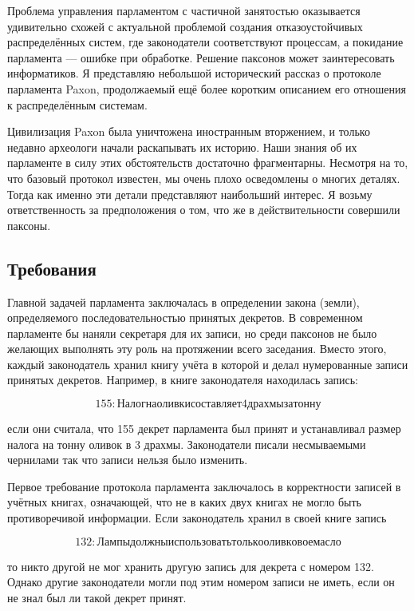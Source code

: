 Проблема управления парламентом с частичной занятостью оказывается удивительно схожей с актуальной проблемой создания отказоустойчивых распределённых систем, где законодатели соответствуют процессам, а покидание парламента --- ошибке при обработке. Решение паксонов может заинтересовать информатиков. Я представляю небольшой исторический рассказ о протоколе парламента Paxon, продолжаемый ещё более коротким описанием его отношения к распределённым системам.

Цивилизация Paxon была уничтожена иностранным вторжением, и только недавно археологи начали раскапывать их историю. Наши знания об их парламенте в силу этих обстоятельств достаточно фрагментарны. Несмотря на то, что базовый протокол известен, мы очень плохо осведомлены о многих деталях. Тогда как именно эти детали представляют наибольший интерес. Я возьму ответственность за предположения о том, что же в действительности совершили паксоны.

\subsection{Требования}

Главной задачей парламента заключалась в определении закона (земли), определяемого последовательностью принятых декретов. В современном парламенте бы наняли секретаря для их записи, но среди паксонов не было желающих выполнять эту роль на протяжении всего заседания. Вместо этого, каждый законодатель хранил книгу учёта в которой и делал нумерованные записи принятых декретов. Например, в книге законодателя \Lambda\iota\nu\chi\partial находилась запись:

\[
    155: Налог на оливки составляет 4 драхмы за тонну
\]

если они считала, что 155 декрет парламента был принят и устанавливал размер налога на тонну оливок в 3 драхмы. Законодатели писали несмываемыми чернилами так что записи нельзя было изменить. 

Первое требование протокола парламента заключалось в корректности записей в учётных книгах, означающей, что не в каких двух книгах не могло быть противоречивой информации. Если законодатель \Phi\iota\partial\epsilon\rho хранил в своей книге запись 

\[
    132: Лампы должны использовать только оливковое масло
\]

то никто другой не мог хранить другую запись для декрета с номером 132. Однако другие законодатели могли под этим номером записи не иметь, если он не знал был ли такой декрет принят.

